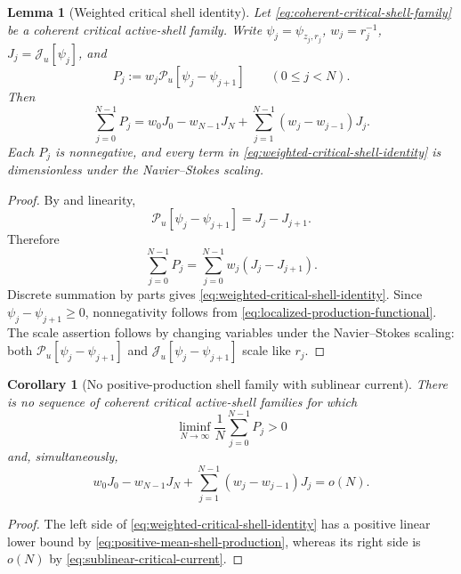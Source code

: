 \documentclass[11pt]{amsart}
\numberwithin{equation}{section}
\theoremstyle{plain}
\newtheorem{lemma}[lemma]{Lemma}
\newtheorem{corollary}[corollary]{Corollary}
\theoremstyle{definition}
\theoremstyle{remark}
\begin{document}
\begin{lemma}[Weighted critical shell identity]
\label{lem:weighted-critical-shell-identity}
Let \eqref{eq:coherent-critical-shell-family} be a coherent critical
active-shell family.  Write
\(\psi_j=\psi_{z_j,r_j}\), \(w_j=r_j^{-1}\),
\(J_j=\mathscr J_u[\psi_j]\), and
\[
 P_j:=w_j\mathscr P_u[\psi_j-\psi_{j+1}]
 \qquad(0\le j<N).
\]
Then
\begin{equation}\label{eq:weighted-critical-shell-identity}
 \sum_{j=0}^{N-1}P_j
 =w_0J_0-w_{N-1}J_N
 +\sum_{j=1}^{N-1}(w_j-w_{j-1})J_j.
\end{equation}
Each \(P_j\) is nonnegative, and every term in
\eqref{eq:weighted-critical-shell-identity} is dimensionless under the
Navier--Stokes scaling.
\end{lemma}

\begin{proof}
By  and linearity,
\[
 \mathscr P_u[\psi_j-\psi_{j+1}]=J_j-J_{j+1}.
\]
Therefore
\[
 \sum_{j=0}^{N-1}P_j
 =\sum_{j=0}^{N-1}w_j(J_j-J_{j+1}).
\]
Discrete summation by parts gives
\eqref{eq:weighted-critical-shell-identity}.  Since
\(\psi_j-\psi_{j+1}\ge0\), nonnegativity follows from
\eqref{eq:localized-production-functional}.  The scale assertion follows by
changing variables under the Navier--Stokes scaling: both
\(\mathscr P_u[\psi_j-\psi_{j+1}]\) and
\(\mathscr J_u[\psi_j-\psi_{j+1}]\) scale like \(r_j\).
\end{proof}

\begin{corollary}[No positive-production shell family with sublinear current]
\label{cor:no-positive-production-sublinear-current}
There is no sequence of coherent critical active-shell families for which
\begin{equation}\label{eq:positive-mean-shell-production}
 \liminf_{N\to\infty}\frac1N\sum_{j=0}^{N-1}P_j>0
\end{equation}
and, simultaneously,
\begin{equation}\label{eq:sublinear-critical-current}
 w_0J_0-w_{N-1}J_N
 +\sum_{j=1}^{N-1}(w_j-w_{j-1})J_j=o(N).
\end{equation}
\end{corollary}

\begin{proof}
The left side of \eqref{eq:weighted-critical-shell-identity} has a positive
linear lower bound by \eqref{eq:positive-mean-shell-production}, whereas its
right side is \(o(N)\) by \eqref{eq:sublinear-critical-current}.
\end{proof}
\end{document}
